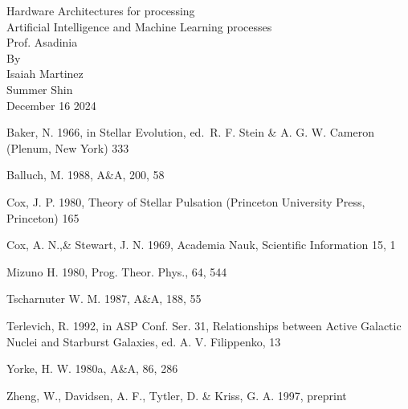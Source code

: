 \documentclass[a4paper,12pt]{article}
\begin{document}
    \begin{titlepage}
        \centering
        Hardware Architectures for processing\\
        Artificial Intelligence and Machine Learning processes\\
        [1.5in]
        
        Prof. Asadinia\\
        [1.5in]
        
        By\\
        Isaiah Martinez\\
        Summer Shin\\

        \vspace{\fill}
        December 16 2024\\
    \end{titlepage}

    
    
    
    

    \begin{thebibliography}{}

         Baker, N. 1966,
            in Stellar Evolution,
            ed.\ R. F. Stein \& A. G. W. Cameron
            (Plenum, New York) 333

         Balluch, M. 1988,
            A\&A, 200, 58

         Cox, J. P. 1980,
            Theory of Stellar Pulsation
            (Princeton University Press, Princeton) 165

         Cox, A. N.,\& Stewart, J. N. 1969,
            Academia Nauk, Scientific Information 15, 1

         Mizuno H. 1980,
            Prog. Theor. Phys., 64, 544
        
         Tscharnuter W. M. 1987,
            A\&A, 188, 55
        
         Terlevich, R. 1992, in ASP Conf. Ser. 31, 
            Relationships between Active Galactic Nuclei and Starburst Galaxies, 
            ed. A. V. Filippenko, 13

         Yorke, H. W. 1980a,
            A\&A, 86, 286

         Zheng, W., Davidsen, A. F., Tytler, D. \& Kriss, G. A.
            1997, preprint

    \end{thebibliography}
\end{document}
